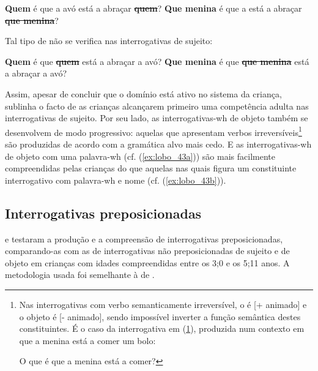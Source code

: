 \documentclass[output=paper]{LSP/langsci}
\begin{document}
\ea\label{ex:lobo_43}
\ea\label{ex:lobo_43a} \textbf{Quem} é que a avó está a abraçar \sout{\textbf{quem}}?
\ex\label{ex:lobo_43b}\textbf{Que menina} é que a  está a abraçar \sout{\textbf{que menina}}?
\zl

Tal tipo de  não se verifica nas interrogativas de sujeito:

\ea\label{ex:lobo_44}
\ea\label{ex:lobo_44a} \textbf{Quem} é que \sout{\textbf{quem}} está a abraçar a avó?
\ex\label{ex:lobo_44b} \textbf{Que menina} é que \sout{\textbf{que menina}} está a abraçar a avó?
\zl

Assim, apesar de concluir que o domínio  está ativo no sistema da criança, \citet{cerejeira2009,cerejeira2010} sublinha o facto de as crianças alcançarem primeiro uma competência adulta nas interrogativas de sujeito. Por seu lado, as interrogativas-wh de objeto também se desenvolvem de modo progressivo: aquelas que apresentam verbos irreversíveis\footnote{Nas interrogativas com verbo semanticamente irreversível, o  é [+ animado] e o objeto é [- animado], sendo impossível inverter a função semântica destes constituintes. É o caso da interrogativa em (\ref{ex:lobo_i3}), produzida num contexto em que a menina está a comer um bolo:

\ea\label{ex:lobo_i3} O que é que a menina está a comer?\z
}
são produzidas de acordo com a gramática alvo mais cedo. E as interrogativas-wh de objeto com uma palavra-wh (cf. (\ref{ex:lobo_43a})) são mais facilmente compreendidas pelas crianças do que aquelas nas quais figura um constituinte interrogativo com palavra-wh e nome (cf. (\ref{ex:lobo_43b})).


\subsection{Interrogativas preposicionadas}
\label{subsec:lobo_interrogativas_prepo}
\citet{baiao2013} e \citet{baiaolobo2014} testaram a produção e a compreensão de interrogativas preposicionadas, comparando-as com as de interrogativas não preposicionadas de sujeito e de objeto em crianças com idades compreendidas entre os 3;0 e os 5;11 anos. A metodologia usada foi semelhante à de \citet{cerejeira2010}.
\end{document}
